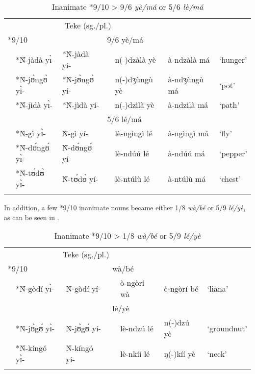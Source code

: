 \documentclass[output=paper,,modfonts,nonflat]{langsci/langscibook}
\begin{document}
\begin{table}
\caption{Inanimate *9/10 > 9/6 \textit{yè/má} or 5/6 \textit{lè/má}}
\label{table12}
\begin{small}
\begin{tabular}{l		l l l  		l		l		l}
\lsptoprule													
\multicolumn{3}{c}{PB (sg./pl.)}					&	\multicolumn{4}{c}{Teke (sg./pl.)}\\
\cmidrule(r){1-3}\cmidrule(l){4-7}
\multicolumn{2}{l}{*9/10}			&		&	\multicolumn{2}{l}{9/6 yè/má}			&		&		\\
	&	*Ǹ-jàdà yɪ̀-	&	*Ǹ-jàdà yí-	&		&	n(-)dzàlà yè	&	à-ndzàlà má	&	`hunger’	\\
	&	*Ǹ-jʊ̀ngʊ̀ yɪ̀-	&	*Ǹ-jʊ̀ngʊ̀ yí-	&		&	n(-)dʒùngù yè	&	à-ndʒùngù má	&	`pot’	\\
	&	*Ǹ-jìdà yɪ̀-	&	*Ǹ-jìdà yí-	&		&	n(-)dzìlà yè	&	à-ndzìlà má	&	`path’	\\	[0.2cm]
	&		&		&	\multicolumn{2}{l}{5/6 lé/má}			&		&		\\
	&	*Ǹ-gì yɪ̀-	&	Ǹ-gì yí-	&		&	lè-ngìngì lé	&	à-ngìngì má	&	`fly’	\\
	&	*Ǹ-dʊ́ngʊ́ yɪ̀-	&	Ǹ-dʊ́ngʊ́ yí-	&		&	lè-ndúú lé	&	à-ndúú má	&	`pepper’	\\
	&	*Ǹ-tʊ́dʊ̀ yɪ̀-	&	Ǹ-tʊ́dʊ̀ yí-	&		&	lè-ntúlù lé	&	à-ntúlù má	&	`chest’	\\
  \lspbottomrule
\end{tabular}
\end{small}
\end{table}

In addition, a few *9/10 inanimate nouns became either 1/8 \textit{wà/bé} or 5/9 \textit{lé/yè}, as can be seen in .

\begin{table}[H]
\caption{Inanimate *9/10 > 1/8 \textit{wà/bé} or 5/9 \textit{lé/yè}}
\label{table13}
\begin{small}
\begin{tabular}{l		l l l  		l		l		l}
\lsptoprule	
\multicolumn{3}{c}{PB (sg./pl.)}					&	\multicolumn{4}{c}{Teke (sg./pl.)}\\
\cmidrule(r){1-3}\cmidrule(l){4-7}
\multicolumn{2}{l}{*9/10}			&		&	\multicolumn{2}{l}{wà/bé}			&		&		\\
	&	*Ǹ-gòdí yɪ̀-	&	Ǹ-gòdí yí-	&		&	ò-ngòrí wà	&	è-ngòrí bé	&	`liana’	\\	[0.2cm]
	&		&		&	\multicolumn{2}{l}{lé/yè}			&		&		\\
	&	*Ǹ-jʊ̀gʊ́ yɪ̀-	&	Ǹ-jʊ̀gʊ́ yí-	&		&	lè-ndzú lé	&	n(-)dzú yè	&	`groundnut’	\\
	&	*Ǹ-kíngó yɪ̀-	&	Ǹ-kíngó yí-	&		&	lè-nkíí lé	&	ŋ(-)kíí yè	&	`neck’	\\												
  \lspbottomrule
\end{tabular}
\end{small}
\end{table}
\end{document}
